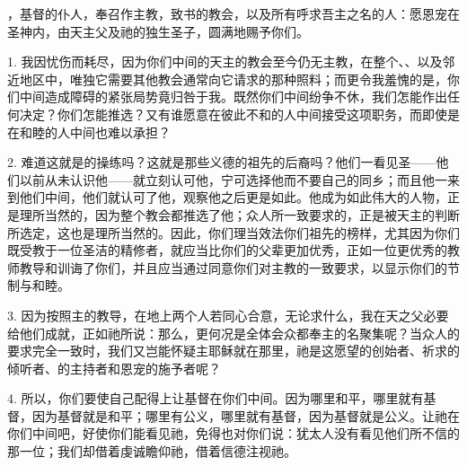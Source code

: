 \par

，基督的仆人，奉召作主教，致书的教会，以及所有呼求吾主之名的人：愿恩宠在圣神内，由天主父及祂的独生圣子，圆满地赐予你们。\par

1. 我因忧伤而耗尽，因为你们中间的天主的教会至今仍无主教，在整个、、以及邻近地区中，唯独它需要其他教会通常向它请求的那种照料；而更令我羞愧的是，你们中间造成障碍的紧张局势竟归咎于我。既然你们中间纷争不休，我们怎能作出任何决定？你们怎能推选？又有谁愿意在彼此不和的人中间接受这项职务，而即使是在和睦的人中间也难以承担？\par

2. 难道这就是的操练吗？这就是那些义德的祖先的后裔吗？他们一看见圣——他们以前从未认识他——就立刻认可他，宁可选择他而不要自己的同乡；而且他一来到他们中间，他们就认可了他，观察他之后更是如此。他成为如此伟大的人物，正是理所当然的，因为整个教会都推选了他；众人所一致要求的，正是被天主的判断所选定，这也是理所当然的。因此，你们理当效法你们祖先的榜样，尤其因为你们既受教于一位圣洁的精修者，就应当比你们的父辈更加优秀，正如一位更优秀的教师教导和训诲了你们，并且应当通过同意你们对主教的一致要求，以显示你们的节制与和睦。\par

3. 因为按照主的教导，在地上两个人若同心合意，无论求什么，我在天之父必要给他们成就，正如祂所说：那么，更何况是全体会众都奉主的名聚集呢？当众人的要求完全一致时，我们又岂能怀疑主耶稣就在那里，祂是这愿望的创始者、祈求的倾听者、的主持者和恩宠的施予者呢？\par

4. 所以，你们要使自己配得上让基督在你们中间。因为哪里和平，哪里就有基督，因为基督就是和平；哪里有公义，哪里就有基督，因为基督就是公义。让祂在你们中间吧，好使你们能看见祂，免得也对你们说：犹太人没有看见他们所不信的那一位；我们却借着虔诚瞻仰祂，借着信德注视祂。\par

